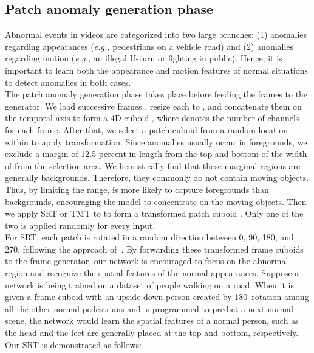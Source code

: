 \documentclass[10pt,twocolumn,letterpaper]{article}
\begin{document}
\subsection{Patch anomaly generation phase}
\label{section3}
Abnormal events in videos are categorized into two large branches: (1) anomalies regarding appearances ({\it e.g.,} pedestrians on a vehicle road) and (2) anomalies regarding motion ({\it e.g.,} an illegal U-turn or fighting in public). Hence, it is important to learn both the appearance and motion features of normal situations to detect anomalies in both cases.  \\
\indent The patch anomaly generation phase takes place before feeding the frames to the generator. We load  successive frames , resize each to , and concatenate them on the temporal axis to form a 4D cuboid , where  denotes the number of channels for each frame. After that, we select a patch cuboid  from a random location within  to apply transformation. Since anomalies usually occur in foregrounds, we exclude a margin of 12.5 percent in length from the top and bottom of the width of  from the selection area. We heuristically find that these marginal regions are generally backgrounds. Therefore, they commonly do not contain moving objects. Thus, by limiting the range,  is more likely to capture foregrounds than backgrounds, encouraging the model to concentrate on the moving objects. Then we apply SRT or TMT to  to form a transformed patch cuboid . Only one of the two is applied randomly for every input. \\
\indent For SRT, each patch is rotated in a random direction between 0\textdegree, 90\textdegree, 180\textdegree, and 270\textdegree, following the approach of~\cite{komodakis:hal-01832768}. By forwarding these transformed frame cuboids   to the frame generator, our network is encouraged to focus on the abnormal region and recognize the spatial features of the normal appearances. Suppose a network is being trained on a dataset of people walking on a road. When it is given a frame cuboid with an upside-down person created by 180\textdegree~rotation among all the other normal pedestrians and is programmed to predict a next normal scene, the network would learn the spatial features of a normal person, such as the head and the feet are generally placed at the top and bottom, respectively. Our SRT is demonstrated as follows:
\vspace{-0.2cm}

\vspace{-0.5cm}
\end{document}
